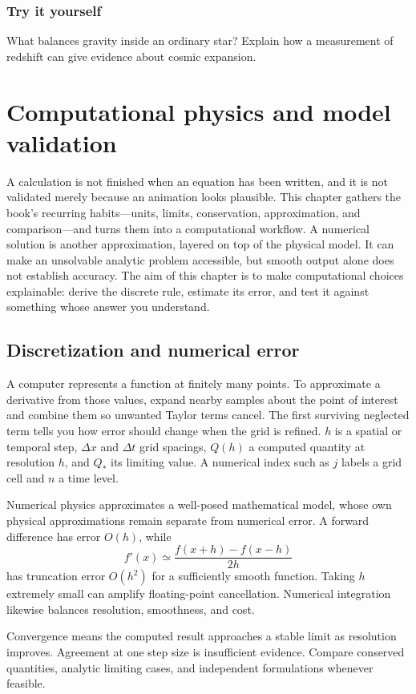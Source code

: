 \documentclass[11pt,oneside]{book}
\theoremstyle{reviewstyle}
\newcommand{\learningcheck}[1]{\subsection*{Try it yourself}\noindent #1\par}
\begin{document}
\learningcheck{What balances gravity inside an ordinary star? Explain how a measurement of redshift can give evidence about cosmic expansion.}

\chapter{Computational physics and model validation}
A calculation is not finished when an equation has been written, and it is not validated merely because an animation looks plausible. This chapter gathers the book's recurring habits---units, limits, conservation, approximation, and comparison---and turns them into a computational workflow.
A numerical solution is another approximation, layered on top of the physical model. It can make an unsolvable analytic problem accessible, but smooth output alone does not establish accuracy. The aim of this chapter is to make computational choices explainable: derive the discrete rule, estimate its error, and test it against something whose answer you understand.

\section{Discretization and numerical error}
A computer represents a function at finitely many points. To approximate a derivative from those values, expand nearby samples about the point of interest and combine them so unwanted Taylor terms cancel. The first surviving neglected term tells you how error should change when the grid is refined. $h$ is a spatial or temporal step, $\Delta x$ and $\Delta t$ grid spacings, $Q(h)$ a computed quantity at resolution $h$, and $Q_*$ its limiting value. A numerical index such as $j$ labels a grid cell and $n$ a time level.

Numerical physics approximates a well-posed mathematical model, whose own physical approximations remain separate from numerical error. A forward difference has error $O(h)$, while
\begin{equation}f'(x)\simeq\frac{f(x+h)-f(x-h)}{2h}\end{equation}
has truncation error $O(h^2)$ for a sufficiently smooth function. Taking $h$ extremely small can amplify floating-point cancellation. Numerical integration likewise balances resolution, smoothness, and cost.

Convergence means the computed result approaches a stable limit as resolution improves. Agreement at one step size is insufficient evidence. Compare conserved quantities, analytic limiting cases, and independent formulations whenever feasible.
\end{document}
